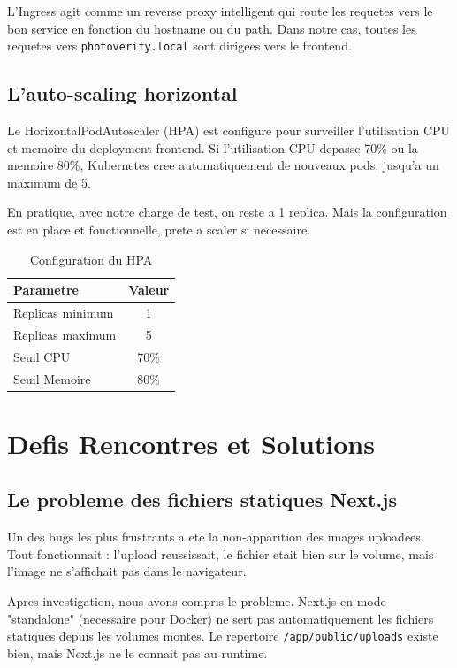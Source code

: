\documentclass[12pt,a4paper]{article}
\begin{document}
L'Ingress agit comme un reverse proxy intelligent qui route les requetes vers le bon service en fonction du hostname ou du path. Dans notre cas, toutes les requetes vers \texttt{photoverify.local} sont dirigees vers le frontend.

\subsection{L'auto-scaling horizontal}

Le HorizontalPodAutoscaler (HPA) est configure pour surveiller l'utilisation CPU et memoire du deployment frontend. Si l'utilisation CPU depasse 70\% ou la memoire 80\%, Kubernetes cree automatiquement de nouveaux pods, jusqu'a un maximum de 5.

En pratique, avec notre charge de test, on reste a 1 replica. Mais la configuration est en place et fonctionnelle, prete a scaler si necessaire.

\begin{table}[h]
\centering
\caption{Configuration du HPA}
\begin{tabular}{lc}
\toprule
Parametre & Valeur \\
\midrule
Replicas minimum & 1 \\
Replicas maximum & 5 \\
Seuil CPU & 70\% \\
Seuil Memoire & 80\% \\
\bottomrule
\end{tabular}
\end{table}

\section{Defis Rencontres et Solutions}

\subsection{Le probleme des fichiers statiques Next.js}

Un des bugs les plus frustrants a ete la non-apparition des images uploadees. Tout fonctionnait : l'upload reussissait, le fichier etait bien sur le volume, mais l'image ne s'affichait pas dans le navigateur.

Apres investigation, nous avons compris le probleme. Next.js en mode "standalone" (necessaire pour Docker) ne sert pas automatiquement les fichiers statiques depuis les volumes montes. Le repertoire \texttt{/app/public/uploads} existe bien, mais Next.js ne le connait pas au runtime.
\end{document}
